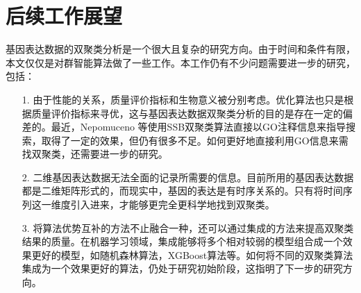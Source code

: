 \section{后续工作展望}
基因表达数据的双聚类分析是一个很大且复杂的研究方向。由于时间和条件有限，本文仅仅是对群智能算法做了一些工作。本工作仍有不少问题需要进一步的研究，包括：
\begin{itemize}
    \item [1.]{由于性能的关系，质量评价指标和生物意义被分别考虑。优化算法也只是根据质量评价指标来寻优，这与基因表达数据双聚类分析的目的是存在一定的偏差的。最近，Nepomuceno 等使用SSB双聚类算法直接以GO注释信息来指导搜索，取得了一定的效果，但仍有很多不足。如何更好地直接利用GO信息来需找双聚类，还需要进一步的研究。}

    \item [2.]{二维基因表达数据无法全面的记录所需要的信息。目前所用的基因表达数据都是二维矩阵形式的，而现实中，基因的表达是有时序关系的。只有将时间序列这一维度引入进来，才能够更完全更科学地找到双聚类。}

    \item [3.]{将算法优势互补的方法不止融合一种，还可以通过集成的方法来提高双聚类结果的质量。在机器学习领域，集成能够将多个相对较弱的模型组合成一个效果更好的模型，如随机森林算法，XGBoost算法等。如何将不同的双聚类算法集成为一个效果更好的算法，仍处于研究初始阶段，这指明了下一步的研究方向。}
    
\end{itemize}